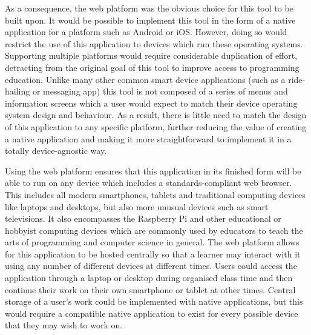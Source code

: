 As a consequence, the web platform was the obvious choice for this tool to be built upon. It would be possible to implement this tool in the form of a native application for a platform such as Android or iOS. However, doing so would restrict the use of this application to devices which run these operating systems. Supporting multiple platforms would require considerable duplication of effort, detracting from the original goal of this tool to improve access to programming education. Unlike many other common smart device applications (such as a ride-hailing or messaging app) this tool is not composed of a series of menus and information screens which a user would expect to match their device operating system design and behaviour. As a result, there is little need to match the design of this application to any specific platform, further reducing the value of creating a native application and making it more straightforward to implement it in a totally device-agnostic way.

Using the web platform ensures that this application in its finished form will be able to run on any device which includes a standards-compliant web browser. This includes all modern smartphones, tablets and traditional computing devices like laptops and desktops, but also more unusual devices such as smart televisions. It also encompasses the Raspberry Pi and other educational or hobbyist computing devices which are commonly used by educators to teach the arts of programming and computer science in general. The web platform allows for this application to be hosted centrally so that a learner may interact with it using any number of different devices at different times. Users could access the application through a laptop or desktop during organised class time and then continue their work on their own smartphone or tablet at other times. Central storage of a user's work could be implemented with native applications, but this would require a compatible native application to exist for every possible device that they may wish to work on.